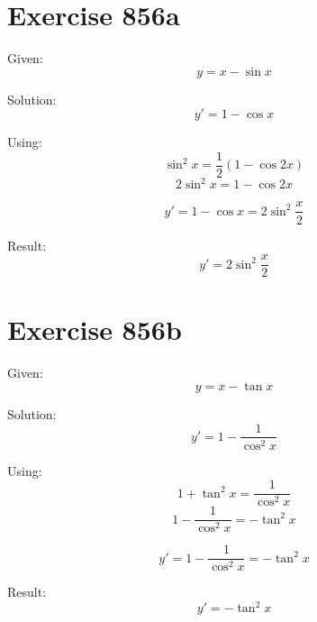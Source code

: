 \documentclass[a4paper, 10pt]{scrartcl}
\begin{document}
\section{Exercise 856a}

Given:
\[
y = x - \sin{x}
\]

Solution:
\[
y' = 1 - \cos{x}
\]

Using:
\[
\sin^{2}{x} = \frac{1}{2}(1 - \cos{2x})
\]
\[
2\sin^{2}{x} = 1 - \cos{2x}
\]

\[
y' = 1 - \cos{x} = 2\sin^{2}{\frac{x}{2}}
\]

Result:
\[
y' = 2\sin^{2}{\frac{x}{2}}
\]

\section{Exercise 856b}

Given:
\[
y = x - \tan{x}
\]

Solution:
\[
y' = 1 - \frac{1}{\cos^{2}{x}}
\]

Using:
\[
1 + \tan^{2}{x} = \frac{1}{\cos^{2}{x}}
\]
\[
1 - \frac{1}{\cos^{2}{x}} = -\tan^{2}{x}
\]

\[
y' = 1 - \frac{1}{\cos^{2}{x}} = -\tan^{2}{x}
\]

Result:
\[
y' = -\tan^{2}{x}
\]
\end{document}
